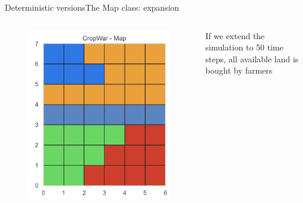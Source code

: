 \documentclass[10pt, aspectratio=169]{beamer}
\def\aa{Deterministic versions}
\def\aab{The Map class: expansion}
\begin{document}
\begin{frame}{\aa}{\aab}
  \begin{columns}
    \centering
    \begin{figure}
      \includegraphics[width=.8\textwidth]{Figures/v12_Map_50t.png}
     \end{figure}
    If we extend the simulation to 50 time steps, all available land is bought by farmers
  \end{columns}
\end{frame}
\end{document}
